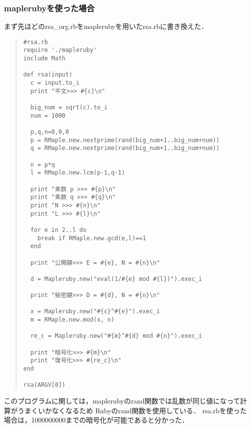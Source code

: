 \subsubsection{maplerubyを使った場合}
まず先ほどのrsa\_org.rbをmaplerubyを用いたrsa.rbに書き換えた．
\begin{quote}\begin{verbatim}
#rsa.rb
require './mapleruby'
include Math

def rsa(input)
  c = input.to_i
  print "平文>>> #{c}\n"
  
  big_num = sqrt(c).to_i
  num = 1000
  
  p,q,n=0,0,0
  p = RMaple.new.nextprime(rand(big_num+1..big_num+num))
  q = RMaple.new.nextprime(rand(big_num+1..big_num+num))
  
  n = p*q
  l = RMaple.new.lcm(p-1,q-1)
  
  print "素数 p >>> #{p}\n"
  print "素数 q >>> #{q}\n"
  print "N >>> #{n}\n"
  print "L >>> #{l}\n"
  
  for e in 2..l do
    break if RMaple.new.gcd(e,l)==1
  end
  
  print "公開鍵>>> E = #{e}, N = #{n}\n"
  
  d = Mapleruby.new("eval(1/#{e} mod #{l})").exec_i
  
  print "秘密鍵>>> D = #{d}, N = #{n}\n"
  
  x = Mapleruby.new("#{c}^#{e}").exec_i
  m = RMaple.new.mod(x, n)
  
  re_c = Mapleruby.new("#{m}^#{d} mod #{n}").exec_i
  
  print "暗号化>>> #{m}\n"
  print "復号化>>> #{re_c}\n"
end

rsa(ARGV[0])
\end{verbatim}\end{quote}
このプログラムに関しては，maplerubyのrand関数では乱数が同じ値になって計算がうまくいかなくなるため
Rubyのrand関数を使用している．
rsa.rbを使った場合は，1000000000までの暗号化が可能であると分かった．
